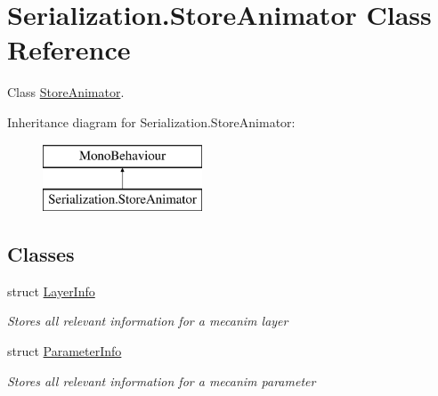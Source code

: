 \hypertarget{class_serialization_1_1_store_animator}{}\section{Serialization.\+Store\+Animator Class Reference}
\label{class_serialization_1_1_store_animator}


Class \hyperlink{class_serialization_1_1_store_animator}{Store\+Animator}.  


Inheritance diagram for Serialization.\+Store\+Animator\+:\begin{figure}[H]
\begin{center}
\leavevmode
\includegraphics[height=2.000000cm]{class_serialization_1_1_store_animator}
\end{center}
\end{figure}
\subsection*{Classes}
\begin{DoxyCompactItemize}
\item 
struct \hyperlink{struct_serialization_1_1_store_animator_1_1_layer_info}{Layer\+Info}
\begin{DoxyCompactList}\small\item\em Stores all relevant information for a mecanim layer \end{DoxyCompactList}\item 
struct \hyperlink{struct_serialization_1_1_store_animator_1_1_parameter_info}{Parameter\+Info}
\begin{DoxyCompactList}\small\item\em Stores all relevant information for a mecanim parameter \end{DoxyCompactList}\end{DoxyCompactItemize}
